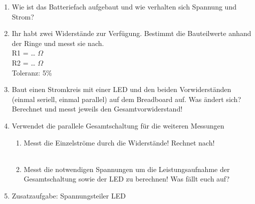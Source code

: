 \begin{enumerate}
  \item Wie ist das Batteriefach aufgebaut und wie verhalten sich Spannung und
    Strom? \\
  \item Ihr habt zwei Widerstände zur Verfügung. Bestimmt die Bauteilwerte
    anhand der Ringe und messt sie nach. \\
    R1 = \dots {} $\Omega$ \\
    R2 = \dots {} $\Omega$ \\
    Toleranz: 5\%
  \item Baut einen Stromkreis mit einer LED und den beiden Vorwiderständen
    (einmal seriell, einmal parallel) auf dem Breadboard auf. Was ändert sich?
    Berechnet und messt jeweils den Gesamtvorwiderstand! \\
  \item Verwendet die parallele Gesamtschaltung für die weiteren Messungen
    \begin{enumerate}
      \item Messt die Einzelströme durch die Widerstände! Rechnet nach! \\
        \\
      \item Messt die notwendigen Spannungen um die Leistungsaufnahme der
        Gesamtschaltung sowie der LED zu berechnen! Was fällt euch auf? \\
    \end{enumerate}
  \item Zusatzaufgabe: Spannungsteiler LED\\

\end{enumerate}

